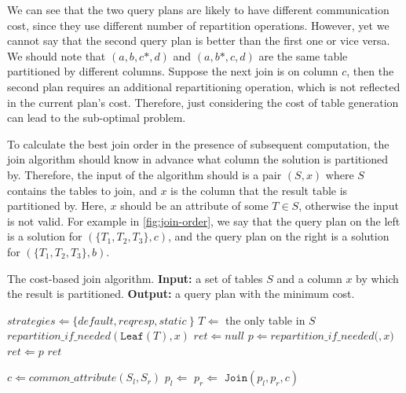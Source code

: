 \documentclass{sokendai_thesis} %
\begin{document}
We can see that the two query plans are likely to have different communication cost, since they use different number of repartition operations.
However, yet we cannot say that the second query plan is better than the first one or vice versa.
We should note that $(a, b, c*, d)$ and $(a, b*, c, d)$ are the same table partitioned by different columns.
Suppose the next join is on column $c$, then the second plan requires an additional repartitioning operation, which is not reflected in the current plan's cost.
Therefore, just considering the cost of table generation can lead to the sub-optimal problem.

To calculate the best join order in the presence of subsequent computation, the join algorithm should know in advance what column the solution is partitioned by.
Therefore, the input of the algorithm should is a pair $(S, x)$ where $S$ contains the tables to join, and $x$ is the column that the result table is partitioned by.
Here, $x$ should be an attribute of some $T\in S$, otherwise the input is not valid.
For example in \autoref{fig:join-order}, we say that the query plan on the left is a solution for $(\{T_1, T_2, T_3\}, c)$, and the query plan on the right is a solution for $(\{T_1, T_2, T_3\}, b)$.

\begin{algorithm}[t] %
\caption{The cost-based join algorithm. \textbf{Input:} a set of tables $S$ and a column $x$ by which the result is partitioned. \textbf{Output:} a query plan with the minimum cost.}
\label{alg:solve}
\begin{algorithmic}[1]
  \State {}
  \State $\textit{strategies}\Leftarrow \{\textit{default},\textit{reqresp},\textit{static}~\}$
  \State{}
    \State $T\Leftarrow$ the only table in $S$
    \State \Return $\textit{repartition\_if\_needed}(\texttt{Leaf}(T), x)$
  \EndIf
  \State{}
  \State $ret \Leftarrow \textit{null}$
        \State $p \Leftarrow \textit{repartition\_if\_needed}($$,x)$
        \State{}
          \State $ret \Leftarrow p$
        \EndIf
      \EndFor
    \EndFor
    \State\Return $ret$
  \EndProcedure

  \State{}
    \State $c \Leftarrow \textit{common\_attribute}(S_l, S_r)$
    \State $p_l \Leftarrow$ 
    \State $p_r \Leftarrow$ 
    \State \Return $\texttt{Join}(p_l, p_r, c)$
  \EndProcedure
\end{algorithmic}
\end{algorithm}
\end{document}

